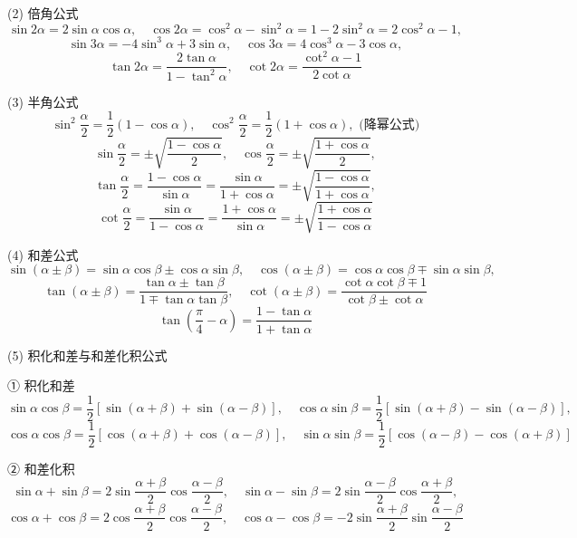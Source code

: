 \documentclass[lang=cn,math=mtpro2,10pt,scheme=chinese,black]{elegantbook}
\begin{document}
(2) 倍角公式
$$ \sin 2\alpha = 2 \sin \alpha \cos \alpha, \quad \cos 2\alpha = \cos^2 \alpha - \sin^2 \alpha = 1 - 2\sin^2 \alpha = 2\cos^2 \alpha - 1, $$
$$ \sin 3\alpha = -4\sin^3 \alpha + 3\sin \alpha, \quad \cos 3\alpha = 4\cos^3 \alpha - 3\cos \alpha, $$
$$ \tan 2\alpha = \frac{2 \tan \alpha}{1 - \tan^2 \alpha}, \quad \cot 2\alpha = \frac{\cot^2 \alpha - 1}{2 \cot \alpha} $$

\vspace{1em}
(3) 半角公式
$$ \sin^2 \frac{\alpha}{2} = \frac{1}{2}(1 - \cos \alpha), \quad \cos^2 \frac{\alpha}{2} = \frac{1}{2}(1 + \cos \alpha), \text{ (降幂公式)} $$
$$ \sin \frac{\alpha}{2} = \pm \sqrt{\frac{1 - \cos \alpha}{2}}, \quad \cos \frac{\alpha}{2} = \pm \sqrt{\frac{1 + \cos \alpha}{2}}, $$
$$ \tan \frac{\alpha}{2} = \frac{1 - \cos \alpha}{\sin \alpha} = \frac{\sin \alpha}{1 + \cos \alpha} = \pm \sqrt{\frac{1 - \cos \alpha}{1 + \cos \alpha}}, $$
$$ \cot \frac{\alpha}{2} = \frac{\sin \alpha}{1 - \cos \alpha} = \frac{1 + \cos \alpha}{\sin \alpha} = \pm \sqrt{\frac{1 + \cos \alpha}{1 - \cos \alpha}} $$

\vspace{1em}
(4) 和差公式
$$ \sin(\alpha \pm \beta) = \sin \alpha \cos \beta \pm \cos \alpha \sin \beta, \quad \cos(\alpha \pm \beta) = \cos \alpha \cos \beta \mp \sin \alpha \sin \beta, $$
$$ \tan(\alpha \pm \beta) = \frac{\tan \alpha \pm \tan \beta}{1 \mp \tan \alpha \tan \beta}, \quad \cot(\alpha \pm \beta) = \frac{\cot \alpha \cot \beta \mp 1}{\cot \beta \pm \cot \alpha} $$
$$ \tan(\frac{\pi}{4} - \alpha) = \frac{1 - \tan \alpha}{1 + \tan \alpha} $$

\vspace{1em}

(5) 积化和差与和差化积公式

① 积化和差
$$ \sin \alpha \cos \beta = \frac{1}{2}[\sin(\alpha + \beta) + \sin(\alpha - \beta)], \quad \cos \alpha \sin \beta = \frac{1}{2}[\sin(\alpha + \beta) - \sin(\alpha - \beta)], $$
$$ \cos \alpha \cos \beta = \frac{1}{2}[\cos(\alpha + \beta) + \cos(\alpha - \beta)], \quad \sin \alpha \sin \beta = \frac{1}{2}[\cos(\alpha - \beta) - \cos(\alpha + \beta)] $$

② 和差化积
$$ \sin \alpha + \sin \beta = 2 \sin \frac{\alpha+\beta}{2} \cos \frac{\alpha-\beta}{2}, \quad \sin \alpha - \sin \beta = 2 \sin \frac{\alpha-\beta}{2} \cos \frac{\alpha+\beta}{2}, $$
$$ \cos \alpha + \cos \beta = 2 \cos \frac{\alpha+\beta}{2} \cos \frac{\alpha-\beta}{2}, \quad \cos \alpha - \cos \beta = -2 \sin \frac{\alpha+\beta}{2} \sin \frac{\alpha-\beta}{2} $$
\end{document}
